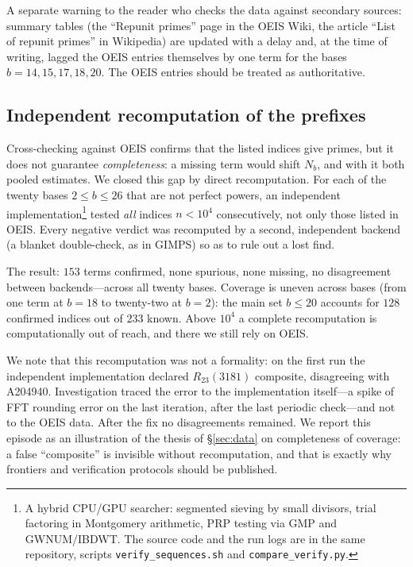 \documentclass[11pt,a4paper]{article}
\theoremstyle{plain}
\theoremstyle{remark}
\begin{document}
A separate warning to the reader who checks the data against secondary sources:
summary tables (the ``Repunit primes'' page in the OEIS Wiki, the article ``List
of repunit primes'' in Wikipedia) are updated with a delay and, at the time of
writing, lagged the OEIS entries themselves by one term for the bases
$b=14,15,17,18,20$. The OEIS entries should be treated as authoritative.

\subsection*{Independent recomputation of the prefixes}

Cross-checking against OEIS confirms that the listed indices give primes, but it
does not guarantee \emph{completeness}: a missing term would shift $N_b$, and
with it both pooled estimates. We closed this gap by direct recomputation. For
each of the twenty bases $2\le b\le26$ that are not perfect powers, an
independent implementation\footnote{A hybrid CPU/GPU searcher: segmented sieving
by small divisors, trial factoring in Montgomery arithmetic, PRP testing via GMP
and GWNUM/IBDWT. The source code and the run logs are in the same repository,
scripts \texttt{verify\_sequences.sh} and \texttt{compare\_verify.py}.} tested
\emph{all} indices $n<10^4$ consecutively, not only those listed in OEIS. Every
negative verdict was recomputed by a second, independent backend (a blanket
double-check, as in GIMPS) so as to rule out a lost find.

The result: $153$ terms confirmed, none spurious, none missing, no disagreement
between backends---across all twenty bases. Coverage is uneven across bases
(from one term at $b=18$ to twenty-two at $b=2$): the main set $b\le20$ accounts
for $128$ confirmed indices out of $233$ known. Above $10^4$ a complete
recomputation is computationally out of reach, and there we still rely on OEIS.

We note that this recomputation was not a formality: on the first run the
independent implementation declared $R_{23}(3181)$ composite, disagreeing with
A204940. Investigation traced the error to the implementation itself---a spike of
FFT rounding error on the last iteration, after the last periodic check---and not
to the OEIS data. After the fix no disagreements remained. We report this episode
as an illustration of the thesis of \S\ref{sec:data} on completeness of
coverage: a false ``composite'' is
invisible without recomputation, and that is exactly why frontiers and
verification protocols should be published.
\end{document}
